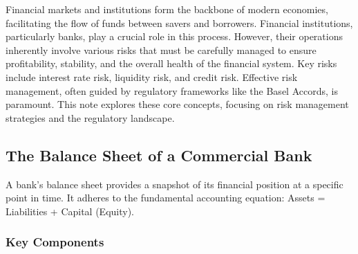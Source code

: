 \newpage 


Financial markets and institutions form the backbone of modern economies, facilitating the flow of funds between savers and borrowers. Financial institutions, particularly banks, play a crucial role in this process. However, their operations inherently involve various risks that must be carefully managed to ensure profitability, stability, and the overall health of the financial system. Key risks include interest rate risk, liquidity risk, and credit risk. Effective risk management, often guided by regulatory frameworks like the Basel Accords, is paramount. This note explores these core concepts, focusing on risk management strategies and the regulatory landscape.


\subsection{The Balance Sheet of a Commercial Bank}

A bank's balance sheet provides a snapshot of its financial position at a specific point in time. It adheres to the fundamental accounting equation: Assets = Liabilities + Capital (Equity).

\subsubsection{Key Components}

